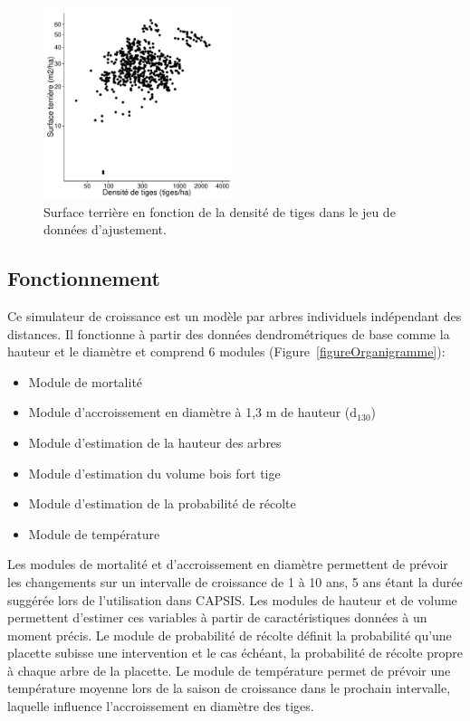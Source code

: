 \documentclass[a4paper,12pt]{article}
\begin{document}
\begin{figure}[h]
\begin{center}
	\includegraphics[width=0.5\textwidth]{./figures/lerfobGagainstN_fr}
	\caption{Surface terrière en fonction de la densité de tiges dans le jeu de données d'ajustement.}
	\label{figGvsN}
\end{center}
\end{figure}

\subsection{Fonctionnement}

Ce simulateur de croissance est un modèle par arbres individuels indépendant des distances. Il fonctionne à partir des données dendrométriques de base comme la hauteur et le diamètre et comprend 6 modules (Figure~\ref{figureOrganigramme}):

\begin{itemize}
  \item Module de mortalité
  \item Module d'accroissement en diamètre à 1,3 m de hauteur ($\text{d}_{130}$)
  \item Module d'estimation de la hauteur des arbres
  \item Module d'estimation du volume bois fort tige
  \item Module d'estimation de la probabilité de récolte
  \item Module de température
\end{itemize}

Les modules de mortalité et d'accroissement en diamètre permettent de prévoir les changements sur un intervalle de croissance de 1 à 10 ans, 5 ans étant la durée suggérée lors de l'utilisation dans CAPSIS. Les modules de hauteur et de volume permettent d'estimer ces variables à partir de caractéristiques données à un moment précis. Le module de probabilité de récolte définit la probabilité qu'une placette subisse une intervention et le cas échéant, la probabilité de récolte propre à chaque arbre de la placette. Le module de température permet de prévoir une température moyenne lors de la saison de croissance dans le prochain intervalle, laquelle influence l'accroissement en diamètre des tiges.
\end{document}
